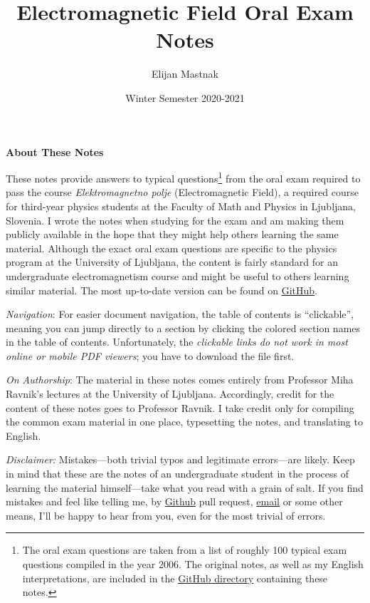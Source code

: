 \documentclass[11pt, a4paper]{article}
\begin{document}
\title{Electromagnetic Field Oral Exam Notes}
\author{Elijan Mastnak}
\date{Winter Semester 2020-2021}
\maketitle

\thispagestyle{empty}  %

\begin{center}
\textbf{About These Notes}
\end{center}
These notes provide answers to typical questions\footnote{The oral exam questions are taken from a list of roughly 100 typical exam questions compiled in the year 2006. The original notes, as well as my English interpretations, are included in the \href{https://github.com/ejmastnak/fmf/tree/main/electromagnetic-field/em-oral-study-guide}{\underline{GitHub directory}} containing these notes.} from the oral exam required to pass the course \textit{Elektromagnetno polje} (Electromagnetic Field), a required course for third-year physics students at the Faculty of Math and Physics in Ljubljana, Slovenia. I wrote the notes when studying for the exam and am making them publicly available in the hope that they might help others learning the same material. Although the exact oral exam questions are specific to the physics program at the University of Ljubljana, the content is fairly standard for an undergraduate electromagnetism course and might be useful to others learning similar material. The most up-to-date version can be found on \href{https://github.com/ejmastnak/fmf/tree/main/electromagnetic-field/}{\underline{GitHub}}.

\vspace{2mm}
\textit{Navigation}: For easier document navigation, the table of contents is ``clickable'', meaning you can jump directly to a section by clicking the colored section names in the table of contents. Unfortunately, the \textit{clickable links do not work in most online or mobile PDF viewers}; you have to download the file first.

\vspace{2mm}
\textit{On Authorship}: The material in these notes comes entirely from Professor Miha Ravnik's lectures at the University of Ljubljana. Accordingly, credit for the content of these notes goes to Professor Ravnik. I take credit only for compiling the common exam material in one place, typesetting the notes, and translating to English.

\vspace{2mm}
\textit{Disclaimer:} Mistakes---both trivial typos and legitimate errors---are likely. Keep in mind that these are the notes of an undergraduate student in the process of learning the material himself---take what you read with a grain of salt. If you find mistakes and feel like telling me, by \href{https://github.com/ejmastnak/fmf}{Github} pull request, \href{mailto:ejmastnak@gmail.com}{email} or some other means, I'll be happy to hear from you, even for the most trivial of errors.
\end{document}
